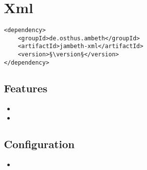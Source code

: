 \section{Xml}
\label{module:Xml}
\ClearAPI
\TODO
\begin{lstlisting}[style=POM,caption={Maven modules to use \emph{Ambeth Xml}}]
<dependency>
	<groupId>de.osthus.ambeth</groupId>
	<artifactId>jambeth-xml</artifactId>
	<version>§\version§</version>
</dependency>
\end{lstlisting}
\subsection{Features}
\begin{itemize}
	\item {}
	\item {}
\end{itemize}

\subsection{Configuration}
\begin{itemize}
	\item {}
\end{itemize}
